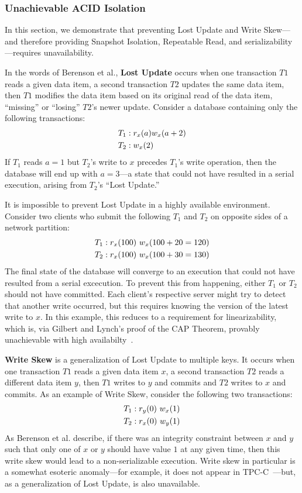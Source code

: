\subsubsection{Unachievable ACID Isolation}

In this section, we demonstrate that preventing Lost Update and Write
Skew---and therefore providing Snapshot Isolation, Repeatable Read,
and serializability---requires unavailability.

In the words of Berenson et al., \textbf{Lost Update} occurs when one
transaction $T1$ reads a given data item, a second transaction $T2$
updates the same data item, then $T1$ modifies the data item based on
its original read of the data item, ``missing'' or ``losing'' $T2$'s
newer update. Consider a database containing only the following
transactions:
\begin{align*}
\small
T_1 &: r_x(a) w_x(a+2)
\\T_2 &: w_x(2)
\end{align*}
If $T_1$ reads $a=1$ but $T_2$'s write to $x$ precedes $T_1$'s write
operation, then the database will end up with $a=3$---a state that
could not have resulted in a serial execution, arising from $T_2$'s
``Lost Update.''

It is impossible to prevent Lost Update in a highly available
environment. Consider two clients who submit the following $T_1$ and
$T_2$ on opposite sides of a network partition:
\begin{align*}
\small
T_1 &: r_x(100)~w_x(100+20=120)
\\T_2 &: r_x(100)~w_x(100+30=130)
\end{align*}
The final state of the database will converge to an execution that
could not have resulted from a serial excecution. To prevent this from
happening, either $T_1$ or $T_2$ should not have committed. Each
client's respective server might try to detect that another write
occurred, but this requires knowing the version of the latest write to
$x$. In this example, this reduces to a requirement for
linearizability, which is, via Gilbert and Lynch's proof of the CAP
Theorem, provably unachievable with high
availabilty~\cite{gilbert-cap}.

\textbf{Write Skew} is a generalization of Lost Update to multiple
keys. It occurs when one transaction $T1$ reads a given data item $x$,
a second transaction $T2$ reads a different data item $y$, then $T1$
writes to $y$ and commits and $T2$ writes to $x$ and commits. As an
example of Write Skew, consider the following two transactions:
\begin{align*}
\small
T_1 &: r_y(0)~w_x(1)
\\T_2 &: r_x(0)~w_y(1)
\end{align*}
As Berenson et al. describe, if there was an integrity constraint
between $x$ and $y$ such that only one of $x$ or $y$ should have value
$1$ at any given time, then this write skew would lead to a
non-serializable execution. Write skew in particular is a somewhat
esoteric anomaly---for example, it does not appear in
TPC-C~\cite{snapshot-serializable}---but, as a generalization of Lost
Update, is also unavailable.


